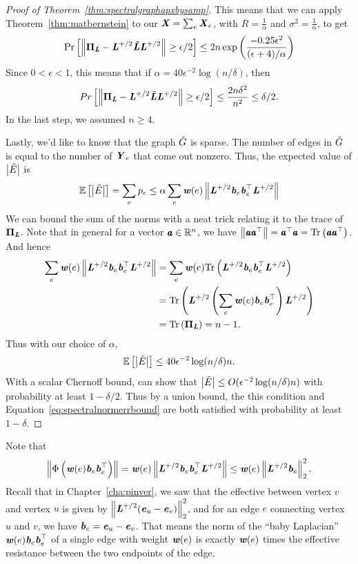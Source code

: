 \begin{proof}[Proof of Theorem~\ref{thm:spectralgraphapxbysamp}]
This means that we can apply Theorem~\ref{thm:matbernstein} to our
$\XX = \sum_e \XX_e$, with $R =  \frac{1}{\alpha}$ and $\sigma^2 =
\frac{1}{\alpha}$, to get
\[
  \Pr\left[\norm{\PPi_{\LL} - \LL^{\pinv/2}\LLtil\LL^{\pinv/2}}
  \geq  \epsilon/2\right]
  \leq 2n\exp\left(\frac{-0.25 \epsilon^2}{(\epsilon +
      4)/\alpha}\right)
\]
Since $0 < \epsilon < 1$, this means that if
$\alpha = 40 \epsilon^{-2}  \log(n/\delta)$,
then
\[
  Pr\left[\norm{\PPi_{\LL} - \LL^{\pinv/2}\LLtil\LL^{\pinv/2}}
    \geq  \epsilon/2\right]
\leq \frac{2n\delta^2}{n^2} \leq \delta/2.
\]
In the last step, we assumed $n \geq 4$.

Lastly, we'd like to know that the graph $\Gtil$ is sparse.
The number of edges in $\Gtil$ is equal to the number of $\YY_e$ that
come out nonzero.
Thus, the expected value of $\abs{\Etil}$ is
\[
  \E{\abs{\Etil}}
  =
  \sum_e p_e \leq \alpha \sum_e \ww(e) \norm{\LL^{\pinv/2}\bb_e\bb_e^{\trp}\LL^{\pinv/2}}
\]
We can bound the sum of the norms with a neat trick relating it to the
trace of $\PPi_{\LL}$.
Note that in general for a vector $\aa \in \R^n$, we have
$\norm{\aa\aa^{\trp}} = \aa^{\trp}\aa = \trace{\aa\aa^{\trp}}$.
And hence
\begin{align*}
  \sum_e
  \ww(e)
  \norm{\LL^{\pinv/2}\bb_e\bb_e^{\trp}\LL^{\pinv/2}}
  &=
  \sum_e
  \ww(e)
  \trace{\LL^{\pinv/2}\bb_e\bb_e^{\trp}\LL^{\pinv/2}}
  \\
  &=
  \trace{ \LL^{\pinv/2}  \left( \sum_e\ww(e) \bb_e\bb_e^{\trp}
    \right)\LL^{\pinv/2}}
  \\
  &= \trace{ \PPi_{\LL} } = n-1.
\end{align*}
Thus with our choice of $\alpha$,
\[
  \E{\abs{\Etil}} \leq 40 \epsilon^{-2}  \log(n/\delta) n.
\]
With a scalar Chernoff bound, can show that $\abs{\Etil} \leq O( \epsilon^{-2}  \log(n/\delta) n)$
with probability at least $1-\delta/2$.
Thus by a union bound, the this condition and
Equation~\eqref{eq:spectralnormerrbound} are both satisfied with
probability at least $1-\delta$.
\end{proof}

\begin{remark}
  Note that
  \[
    \norm{\Phi\left(\ww(e) \bb_e\bb_e^{\trp} \right)}
    =
    \ww(e)
   \norm{\LL^{\pinv/2}\bb_e\bb_e^{\trp}\LL^{\pinv/2}}
  \leq
  \ww(e)\norm{ \LL^{\pinv/2}\bb_e}_2^2.
  \]
  Recall that in Chapter~\ref{cha:pinver}, we saw that the effective between vertex
  $v$ and vertex $u$ is given by
  $\norm{ \LL^{\pinv/2}(\ee_u - \ee_v)}_2^2$, and for an edge $e$
  connecting vertex $u$ and $v$, we have $\bb_{e}= \ee_u - \ee_v$.
 That means the norm of the ``baby Laplacian'' $\ww(e) \bb_e\bb_e^{\trp}$ of a single edge with weight
  $\ww(e)$ is exactly $\ww(e)$ times the effective resistance between
  the two endpoints of the edge.
\end{remark}


